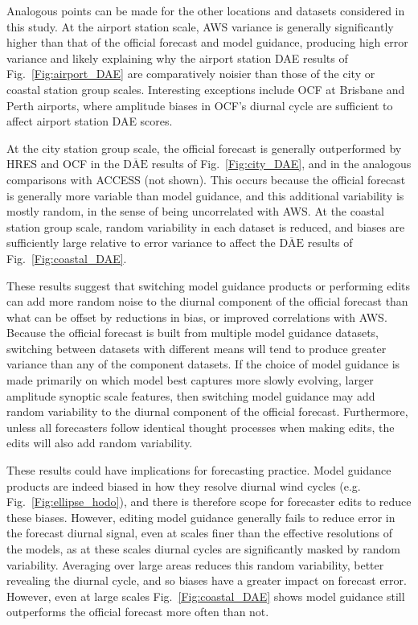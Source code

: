 \documentclass{ametsoc}
\begin{document}
Analogous points can be made for the other locations and datasets considered in this study. At the airport station scale, AWS variance is generally significantly higher than that of the official forecast and model guidance, producing high error variance and likely explaining why the airport station DAE results of Fig.~\ref{Fig:airport_DAE} are comparatively noisier than those of the city or coastal station group scales. Interesting exceptions include OCF at Brisbane and Perth airports, where amplitude biases in OCF's diurnal cycle are sufficient to affect airport station DAE scores.

At the city station group scale, the official forecast is generally outperformed by HRES and OCF in the $\overline{\text{DAE}}$ results of Fig.~\ref{Fig:city_DAE}, and in the analogous comparisons with ACCESS (not shown). This occurs because the official forecast is generally more variable than model guidance, and this additional variability is mostly random, in the sense of being uncorrelated with AWS. At the coastal station group scale, random variability in each dataset is reduced, and biases are sufficiently large relative to error variance to affect the $\overline{\text{DAE}}$ results of Fig.~\ref{Fig:coastal_DAE}.

These results suggest that switching model guidance products or performing edits can add more random noise to the diurnal component of the official forecast than what can be offset by reductions in bias, or improved correlations with AWS. Because the official forecast is built from multiple model guidance datasets, switching between datasets with different means will tend to produce greater variance than any of the component datasets. If the choice of model guidance is made primarily on which model best captures more slowly evolving, larger amplitude synoptic scale features, then switching model guidance may add random variability to the diurnal component of the official forecast. Furthermore, unless all forecasters follow identical thought processes when making edits, the edits will also add random variability. 

These results could have implications for forecasting practice. Model guidance products are indeed biased in how they resolve diurnal wind cycles (e.g. Fig.~\ref{Fig:ellipse_hodo}), and there is therefore scope for forecaster edits to reduce these biases. However, editing model guidance generally fails to reduce error in the forecast diurnal signal, even at scales finer than the effective resolutions of the models, as at these scales diurnal cycles are significantly masked by random variability. Averaging over large areas reduces this random variability, better revealing the diurnal cycle, and so biases have a greater impact on forecast error. However, even at large scales Fig.~\ref{Fig:coastal_DAE} shows model guidance still outperforms the official forecast more often than not.
\end{document}
